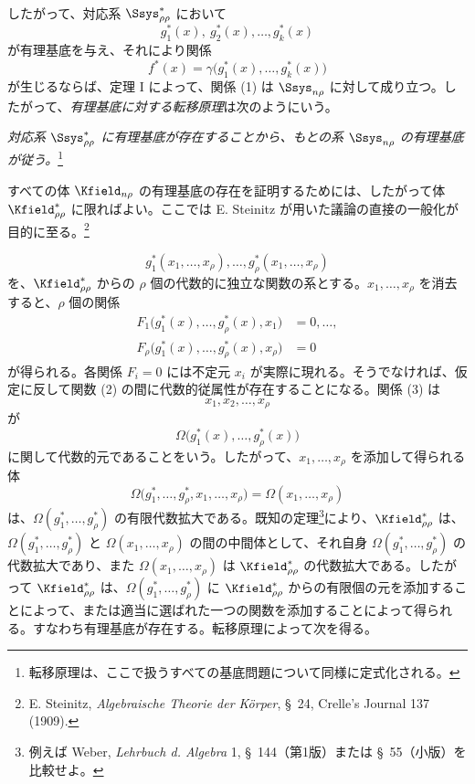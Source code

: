 \documentclass[11pt]{article}
\begin{document}
したがって、対応系 $\Ssys^*_{\rho\rho}$ において
\[
  g_1^*(x),\ g_2^*(x),\ldots,g_k^*(x)
\]
が有理基底を与え、それにより関係
\[
  f^*(x)=\gamma\bigl(g_1^*(x),\ldots,g_k^*(x)\bigr)
\]
が生じるならば、定理 I によって、関係 (1) は $\Ssys_{n\rho}$ に対して成り立つ。したがって、\emph{有理基底に対する転移原理}は次のようにいう。

\emph{対応系 $\Ssys^*_{\rho\rho}$ に有理基底が存在することから、もとの系 $\Ssys_{n\rho}$ の有理基底が従う。}\footnote{転移原理は、ここで扱うすべての基底問題について同様に定式化される。}

すべての体 $\Kfield_{n\rho}$ の有理基底の存在を証明するためには、したがって体 $\Kfield^*_{\rho\rho}$ に限ればよい。ここでは E. Steinitz が用いた議論の直接の一般化が目的に至る。\footnote{E. Steinitz, \emph{Algebraische Theorie der Körper}, \S\ 24, Crelle's Journal 137 (1909).}

\begin{equation}
  g_1^*(x_1,\ldots,x_\rho),\ldots,
  g_\rho^*(x_1,\ldots,x_\rho)
\tag{2}
\end{equation}
を、$\Kfield^*_{\rho\rho}$ からの $\rho$ 個の代数的に独立な関数の系とする。$x_1,\ldots,x_\rho$ を消去すると、$\rho$ 個の関係
\begin{equation}
\begin{aligned}
  F_1\bigl(g_1^*(x),\ldots,g_\rho^*(x),x_1\bigr)&=0,\ldots,\\
  F_\rho\bigl(g_1^*(x),\ldots,g_\rho^*(x),x_\rho\bigr)&=0
\end{aligned}
\tag{3}
\end{equation}
が得られる。各関係 $F_i=0$ には不定元 $x_i$ が実際に現れる。そうでなければ、仮定に反して関数 (2) の間に代数的従属性が存在することになる。関係 (3) は
\[
  x_1,x_2,\ldots,x_\rho
\]
が
\[
  \Omega\bigl(g_1^*(x),\ldots,g_\rho^*(x)\bigr)
\]
に関して代数的元であることをいう。したがって、$x_1,\ldots,x_\rho$ を添加して得られる体
\[
  \Omega\bigl(g_1^*,\ldots,g_\rho^*,x_1,
  \ldots,x_\rho\bigr)=\Omega(x_1,
  \ldots,x_\rho)
\]
は、$\Omega(g_1^*,\ldots,g_\rho^*)$ の有限代数拡大である。既知の定理\footnote{例えば Weber, \emph{Lehrbuch d. Algebra} 1, \S\ 144（第1版）または \S\ 55（小版）を比較せよ。}により、$\Kfield^*_{\rho\rho}$ は、$\Omega(g_1^*,\ldots,g_\rho^*)$ と $\Omega(x_1,\ldots,x_\rho)$ の間の中間体として、それ自身 $\Omega(g_1^*,\ldots,g_\rho^*)$ の代数拡大であり、また $\Omega(x_1,\ldots,x_\rho)$ は $\Kfield^*_{\rho\rho}$ の代数拡大である。したがって $\Kfield^*_{\rho\rho}$ は、$\Omega(g_1^*,\ldots,g_\rho^*)$ に $\Kfield^*_{\rho\rho}$ からの有限個の元を添加することによって、または適当に選ばれた一つの関数を添加することによって得られる。すなわち有理基底が存在する。転移原理によって次を得る。
\end{document}
